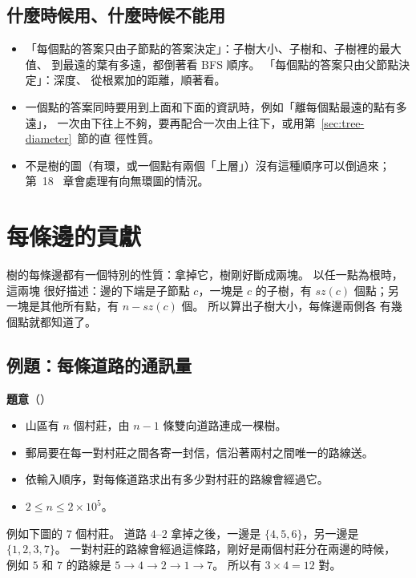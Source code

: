 \subsection{什麼時候用、什麼時候不能用}

\begin{itemize}
\item 「每個點的答案只由子節點的答案決定」：子樹大小、子樹和、子樹裡的最大值、
到最遠的葉有多遠，都倒著看 BFS 順序。 「每個點的答案只由父節點決定」：深度、
從根累加的距離，順著看。
\item 一個點的答案同時要用到上面和下面的資訊時，例如「離每個點最遠的點有多遠」，
一次由下往上不夠，要再配合一次由上往下，或用第~\ref{sec:tree-diameter}~節的直
徑性質。
\item 不是樹的圖（有環，或一個點有兩個「上層」）沒有這種順序可以倒過來；第~18~
章會處理有向無環圖的情況。
\end{itemize}

\section{每條邊的貢獻}
\label{sec:tree-edge}

樹的每條邊都有一個特別的性質：拿掉它，樹剛好斷成兩塊。 以任一點為根時，這兩塊
很好描述：邊的下端是子節點 $c$，一塊是 $c$ 的子樹，有 $\mathit{sz}(c)$ 個點；另
一塊是其他所有點，有 $n - \mathit{sz}(c)$ 個。 所以算出子樹大小，每條邊兩側各
有幾個點就都知道了。

\subsection{例題：每條道路的通訊量}
\label{sec:ex-roads}

\textbf{題意}（）

\begin{itemize}
\item 山區有 $n$ 個村莊，由 $n - 1$ 條雙向道路連成一棵樹。
\item 郵局要在每一對村莊之間各寄一封信，信沿著兩村之間唯一的路線送。
\item 依輸入順序，對每條道路求出有多少對村莊的路線會經過它。
\item $2 \le n \le 2 \times 10^5$。
\end{itemize}

例如下圖的 $7$ 個村莊。 道路 $4$--$2$ 拿掉之後，一邊是 $\{4, 5, 6\}$，另一邊是
$\{1, 2, 3, 7\}$。 一對村莊的路線會經過這條路，剛好是兩個村莊分在兩邊的時候，
例如 $5$ 和 $7$ 的路線是 $5 \to 4 \to 2 \to 1 \to 7$。 所以有 $3 \times 4 =
12$ 對。

